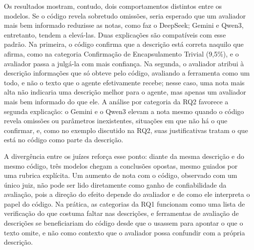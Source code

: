 Os resultados mostram, contudo, dois comportamentos distintos entre os modelos. Se o código revela sobretudo omissões, seria esperado que um avaliador mais bem informado reduzisse as notas, como faz o DeepSeek; Gemini e Qwen3, entretanto, tendem a elevá-las. Duas explicações são compatíveis com esse padrão. Na primeira, o código confirma que a descrição está correta naquilo que afirma, como na categoria Confirmação de Encapsulamento Trivial (9,5\%), e o avaliador passa a julgá-la com mais confiança. Na segunda, o avaliador atribui à descrição informações que só obteve pelo código, avaliando a ferramenta como um todo, e não o texto que o agente efetivamente recebe; nesse caso, uma nota mais alta não indicaria uma descrição melhor para o agente, mas apenas um avaliador mais bem informado do que ele. A análise por categoria da RQ2 favorece a segunda explicação: o Gemini e o Qwen3 elevam a nota mesmo quando o código revela omissões ou parâmetros inexistentes, situações em que não há o que confirmar, e, como no exemplo discutido na RQ2, suas justificativas tratam o que está no código como parte da descrição.

A divergência entre os juízes reforça esse ponto: diante da mesma descrição e do mesmo código, três modelos chegam a conclusões opostas, mesmo guiados por uma rubrica explícita. Um aumento de nota com o código, observado com um único juiz, não pode ser lido diretamente como ganho de confiabilidade da avaliação, pois a direção do efeito depende do avaliador e de como ele interpreta o papel do código. Na prática, as categorias da RQ1 funcionam como uma lista de verificação do que costuma faltar nas descrições, e ferramentas de avaliação de descrições se beneficiariam do código desde que o usassem para apontar o que o texto omite, e não como contexto que o avaliador possa confundir com a própria descrição.
